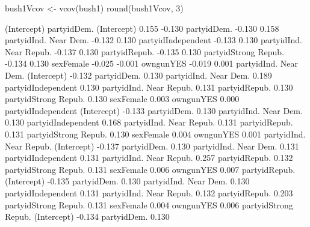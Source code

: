 \begin{Schunk}
\begin{Sinput}
   bush1Vcov <- vcov(bush1)
   round(bush1Vcov, 3)
\end{Sinput}
\begin{Soutput}
                        (Intercept) partyidDem.
(Intercept)                   0.155      -0.130
partyidDem.                  -0.130       0.158
partyidInd. Near Dem.        -0.132       0.130
partyidIndependent           -0.133       0.130
partyidInd. Near Repub.      -0.137       0.130
partyidRepub.                -0.135       0.130
partyidStrong Repub.         -0.134       0.130
sexFemale                    -0.025      -0.001
owngunYES                    -0.019       0.001
                        partyidInd. Near Dem.
(Intercept)                            -0.132
partyidDem.                             0.130
partyidInd. Near Dem.                   0.189
partyidIndependent                      0.130
partyidInd. Near Repub.                 0.131
partyidRepub.                           0.130
partyidStrong Repub.                    0.130
sexFemale                               0.003
owngunYES                               0.000
                        partyidIndependent
(Intercept)                         -0.133
partyidDem.                          0.130
partyidInd. Near Dem.                0.130
partyidIndependent                   0.168
partyidInd. Near Repub.              0.131
partyidRepub.                        0.131
partyidStrong Repub.                 0.130
sexFemale                            0.004
owngunYES                            0.001
                        partyidInd. Near Repub.
(Intercept)                              -0.137
partyidDem.                               0.130
partyidInd. Near Dem.                     0.131
partyidIndependent                        0.131
partyidInd. Near Repub.                   0.257
partyidRepub.                             0.132
partyidStrong Repub.                      0.131
sexFemale                                 0.006
owngunYES                                 0.007
                        partyidRepub.
(Intercept)                    -0.135
partyidDem.                     0.130
partyidInd. Near Dem.           0.130
partyidIndependent              0.131
partyidInd. Near Repub.         0.132
partyidRepub.                   0.203
partyidStrong Repub.            0.131
sexFemale                       0.004
owngunYES                       0.006
                        partyidStrong Repub.
(Intercept)                           -0.134
partyidDem.                            0.130

\end{Soutput}
\end{Schunk}
